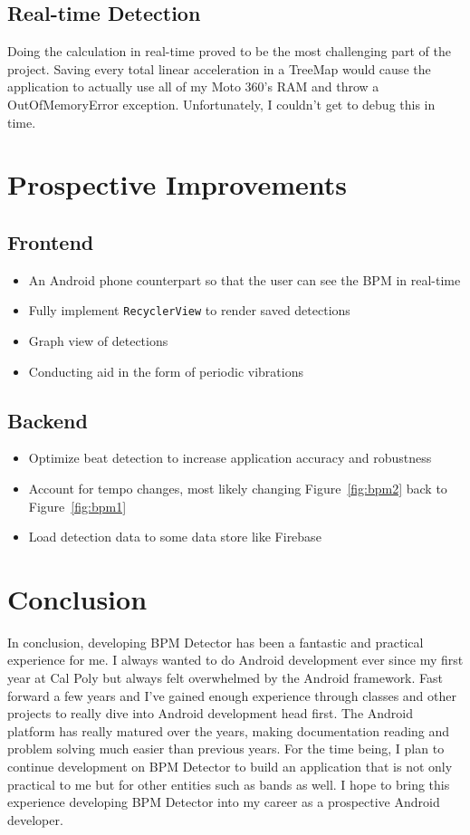 \documentclass[12pt]{article}
\begin{document}
\subsection{Real-time Detection}
Doing the calculation in real-time proved to be the most challenging part of the project. Saving every total linear acceleration in a TreeMap would cause the application to actually use all of my Moto 360's RAM and throw a OutOfMemoryError exception. Unfortunately, I couldn't get to debug this in time.

\section{Prospective Improvements}
\subsection{Frontend}
\begin{itemize}
\item An Android phone counterpart so that the user can see the BPM in real-time
\item Fully implement \texttt{RecyclerView} to render saved detections
\item Graph view of detections
\item Conducting aid in the form of periodic vibrations
\end{itemize}

\subsection{Backend}
\begin{itemize}
\item Optimize beat detection to increase application accuracy and robustness
\item Account for tempo changes, most likely changing Figure~\ref{fig:bpm2} back to Figure~\ref{fig:bpm1}
\item Load detection data to some data store like Firebase
\end{itemize}

\section{Conclusion}
In conclusion, developing BPM Detector has been a fantastic and practical experience for me. I always wanted to do Android development ever since my first year at Cal Poly but always felt overwhelmed by the Android framework. Fast forward a few years and I've gained enough experience through classes and other projects to really dive into Android development head first. The Android platform has really matured over the years, making documentation reading and problem solving much easier than previous years. For the time being, I plan to continue development on BPM Detector to build an application that is not only practical to me but for other entities such as bands as well. I hope to bring this experience developing BPM Detector into my career as a prospective Android developer.
\end{document}
